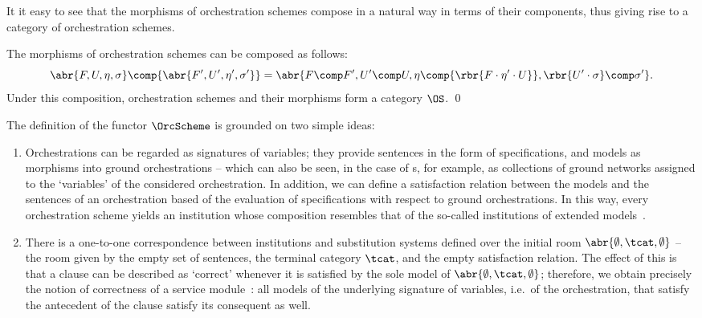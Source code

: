 \documentclass{LMCS}
\begin{document}
  It it easy to see that the morphisms of orchestration schemes compose in a natural way in terms of their components, thus giving rise to a category of orchestration schemes.

  \begin{prop}
    The morphisms of orchestration schemes can be composed as follows:
    \[
    \abr{F, U, \eta, \sigma} \comp {\abr{F', U', \eta', \sigma'}} = \abr{F \comp F', U' \comp U, \eta \comp {\rbr{F \cdot \eta' \cdot U}}, \rbr{U' \cdot \sigma} \comp \sigma'}.
    \]
    Under this composition, orchestration schemes and their morphisms form a category \(\OS\).
    \qed
  \end{prop}

  The definition of the functor \(\OrcScheme\) is grounded on two simple ideas:
  \begin{enumerate}

  \item Orchestrations can be regarded as signatures of variables; they provide sentences in the form of specifications, and models as morphisms into ground orchestrations -- which can also be seen, in the case of s, for example, as collections of ground networks assigned to the `variables' of the considered orchestration.  In addition, we can define a satisfaction relation between the models and the sentences of an orchestration based of the evaluation of specifications with respect to ground orchestrations.  In this way, every orchestration scheme yields an institution whose composition resembles that of the so-called institutions of extended models~\cite{Schroder-Mossakowski-Luth:Type-class-polymorphism-2004}.

  \item There is a one-to-one correspondence between institutions and substitution systems defined over the initial room \(\abr{\emptyset, \tcat, \emptyset}\) -- the room given by the empty set of sentences, the terminal category \(\tcat\), and the empty satisfaction relation.  The effect of this is that a clause can be described as `correct' whenever it is satisfied by the sole model of \(\abr{\emptyset, \tcat, \emptyset}\); therefore, we obtain precisely the notion of correctness of a service module~\cite{Fiadeiro-Lopes-Bocchi:An-abstract-model-for-service-discovery-and-binding-2011}: all models of the underlying signature of variables, i.e.\ of the orchestration, that satisfy the antecedent of the clause satisfy its consequent as well.

  \end{enumerate}
\end{document}
